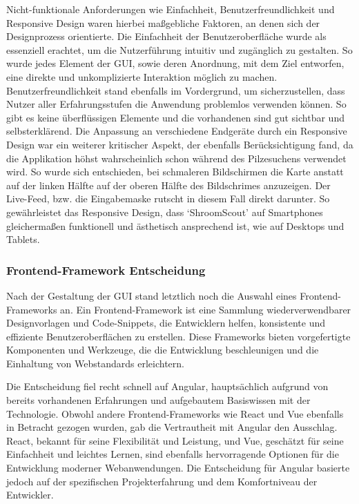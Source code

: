 \documentclass[../main.tex]{subfiles} %
\begin{document}
Nicht-funktionale Anforderungen wie Einfachheit, Benutzerfreundlichkeit und Responsive Design waren hierbei maßgebliche
Faktoren, an denen sich der Designprozess orientierte. Die Einfachheit der Benutzeroberfläche wurde als essenziell erachtet,
um die Nutzerführung intuitiv und zugänglich zu gestalten. So wurde jedes Element der GUI, sowie deren Anordnung, mit dem Ziel
entworfen, eine direkte und unkomplizierte Interaktion möglich zu machen. Benutzerfreundlichkeit stand ebenfalls im Vordergrund,
um sicherzustellen, dass Nutzer aller Erfahrungsstufen die Anwendung problemlos verwenden können. So gibt es keine überflüssigen
Elemente und die vorhandenen sind gut sichtbar und selbsterklärend. Die Anpassung an verschiedene Endgeräte durch ein Responsive
Design war ein weiterer kritischer Aspekt, der ebenfalls Berücksichtigung fand, da die Applikation höhst wahrscheinlich schon
während des Pilzesuchens verwendet wird. So wurde sich entschieden, bei schmaleren Bildschirmen die Karte anstatt auf der linken
Hälfte auf der oberen Hälfte des Bildschrimes anzuzeigen. Der Live-Feed, bzw. die Eingabemaske rutscht in diesem Fall direkt darunter.
So gewährleistet das Responsive Design, dass `ShroomScout' auf Smartphones gleichermaßen funktionell und ästhetisch ansprechend ist,
wie auf Desktops und Tablets.

\subsubsection{Frontend-Framework Entscheidung}

Nach der Gestaltung der GUI stand letztlich noch die Auswahl eines Frontend-Frameworks an. Ein Frontend-Framework ist eine Sammlung
wiederverwendbarer Designvorlagen und Code-Snippets, die Entwicklern helfen, konsistente und effiziente Benutzeroberflächen zu
erstellen. Diese Frameworks bieten vorgefertigte Komponenten und Werkzeuge, die die Entwicklung beschleunigen und die Einhaltung
von Webstandards erleichtern.

Die Entscheidung fiel recht schnell auf Angular, hauptsächlich aufgrund von bereits vorhandenen Erfahrungen und aufgebautem
Basiswissen mit der Technologie. Obwohl andere Frontend-Frameworks wie React und Vue ebenfalls in Betracht gezogen wurden,
gab die Vertrautheit mit Angular den Ausschlag. React, bekannt für seine Flexibilität und Leistung, und Vue, geschätzt für
seine Einfachheit und leichtes Lernen, sind ebenfalls hervorragende Optionen für die Entwicklung moderner Webanwendungen. Die
Entscheidung für Angular basierte jedoch auf der spezifischen Projekterfahrung und dem Komfortniveau der Entwickler.
\end{document}
